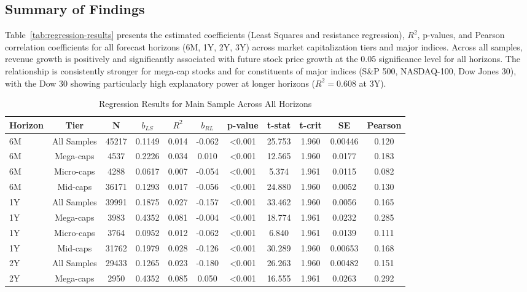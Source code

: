 \documentclass[11pt]{article}
\begin{document}
\subsection{Summary of Findings}
Table~\ref{tab:regression-results} presents the estimated coefficients (Least Squares and resistance regression), $R^2$, p-values, and Pearson correlation coefficients for all forecast horizons (6M, 1Y, 2Y, 3Y) across market capitalization tiers and major indices. Across all samples, revenue growth is positively and significantly associated with future stock price growth at the 0.05 significance level for all horizons. The relationship is consistently stronger for mega-cap stocks and for constituents of major indices (S\&P 500, NASDAQ-100, Dow Jones 30), with the Dow 30 showing particularly high explanatory power at longer horizons ($R^2 = 0.608$ at 3Y).
\begin{table*}[h]
\centering
\caption{Regression Results for Main Sample Across All Horizons}
\label{tab:regression-all}
\small
\begin{tabular}{lcccccccccc}
\toprule
Horizon & Tier & N & $b_{LS}$ & $R^2$ & $b_{RL}$ & p-value & t-stat & t-crit & SE & Pearson \\
\midrule
6M  & All Samples & 45217 & 0.1149 & 0.014 & -0.062 & <0.001 & 25.753 & 1.960 & 0.00446 & 0.120 \\
6M  & Mega-caps   & 4537  & 0.2226 & 0.034 &  0.010 & <0.001  & 12.565 & 1.960 & 0.0177  & 0.183 \\
6M  & Micro-caps  & 4288  & 0.0617 & 0.007 & -0.054 & <0.001    &  5.374 & 1.961 & 0.0115  & 0.082 \\
6M  & Mid-caps    & 36171 & 0.1293 & 0.017 & -0.056 & <0.001 & 24.880 & 1.960 & 0.0052  & 0.130 \\
\midrule
1Y  & All Samples & 39991 & 0.1875 & 0.027 & -0.157 & <0.001 & 33.462 & 1.960 & 0.0056  & 0.165 \\
1Y  & Mega-caps   & 3983  & 0.4352 & 0.081 & -0.004 & <0.001  & 18.774 & 1.961 & 0.0232  & 0.285 \\
1Y  & Micro-caps  & 3764  & 0.0952 & 0.012 & -0.062 & <0.001  &  6.840 & 1.961 & 0.0139  & 0.111 \\
1Y  & Mid-caps    & 31762 & 0.1979 & 0.028 & -0.126 & <0.001 & 30.289 & 1.960 & 0.00653 & 0.168 \\
\midrule
2Y  & All Samples & 29433 & 0.1265 & 0.023 & -0.180 & <0.001 & 26.263 & 1.960 & 0.00482 & 0.151 \\
2Y  & Mega-caps   & 2950  & 0.4352 & 0.085 &  0.050 & <0.001  & 16.555 & 1.961 & 0.0263  & 0.292 \\

\end{tabular}
\end{table*}
\end{document}
